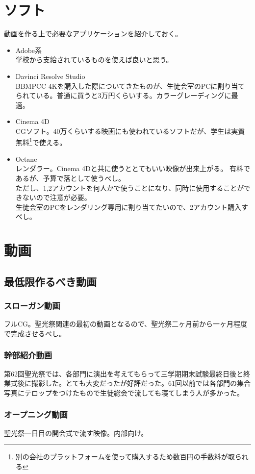 \documentclass[dvipdfmx,jb5]{jarticle}
\begin{document}
\section{ソフト}
 動画を作る上で必要なアプリケーションを紹介しておく。
 \begin{itemize}
  \item Adobe系\\
  学校から支給されているものを使えば良いと思う。
  \item Davinci Resolve Studio\\
  BBMPCC 4Kを購入した際についてきたものが、生徒会室のPCに割り当てられている。普通に買うと3万円くらいする。カラーグレーディングに最適。
  \item Cinema 4D\\
  CGソフト。40万くらいする映画にも使われているソフトだが、学生は実質無料\footnote{別の会社のプラットフォームを使って購入するため数百円の手数料が取られる}で使える。
  \item Octane\\
  レンダラー。Cinema 4Dと共に使うととてもいい映像が出来上がる。
  有料であるが、予算で落として使うべし。\\ただし、1,2アカウントを何人かで使うことになり、同時に使用することができないので注意が必要。\\生徒会室のPCをレンダリング専用に割り当てたいので、2アカウント購入すべし。
 \end{itemize}
 \newpage
\section{動画}
 \subsection{最低限作るべき動画}
  \subsubsection{スローガン動画}
  フルCG。聖光祭関連の最初の動画となるので、聖光祭二ヶ月前から一ヶ月程度で完成させるべし。
  \subsubsection{幹部紹介動画}
  第62回聖光祭では、各部門に演出を考えてもらって三学期期末試験最終日後と終業式後に撮影した。とても大変だったが好評だった。61回以前では各部門の集合写真にテロップをつけたもので生徒総会で流しても寝てしまう人が多かった。
  \subsubsection{オープニング動画}
  聖光祭一日目の開会式で流す映像。内部向け。
\end{document}
